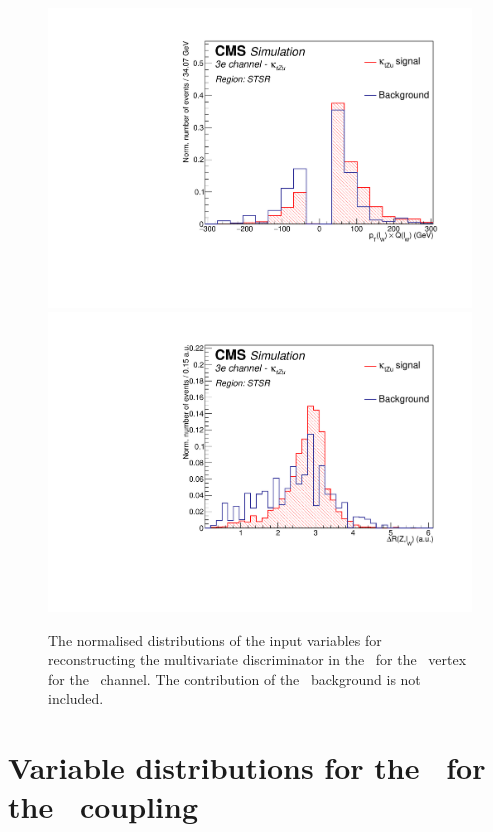 \begin{figure}[htbp]
	\includegraphics[width=0.3\linewidth]{6_Search/Figures/PlotsTechnics/ptWQZutsingletopeee_norm}
	\includegraphics[width=0.3\linewidth]{6_Search/Figures/PlotsTechnics/dRZWlepZutsingletopeee_norm}
	\caption{The normalised distributions of the input variables for reconstructing the multivariate discriminator in the \STSR\ for the \Zut\ vertex for the \eee\ channel. The contribution of the \NPL\ background is not included. }
	\label{fig:singletopZutnormalizedeee}
\end{figure}


\clearpage
\section{Variable distributions  for the \TTSR\ for the \Zut\ coupling}
\label{app:BDTcorrZutTop}

